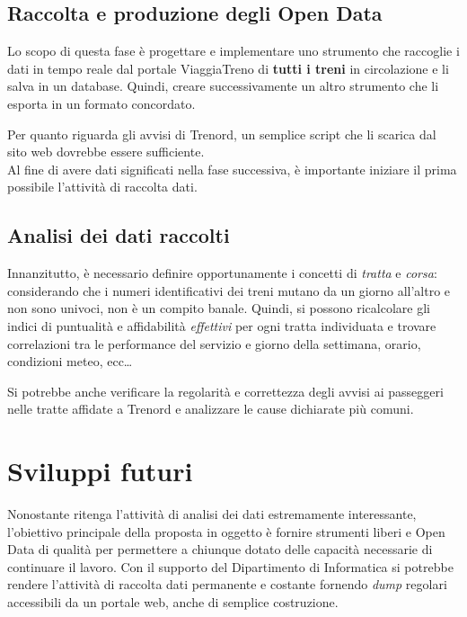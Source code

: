 \documentclass[italian,11pt,a4paper,final]{article}
\begin{document}
	\subsection{Raccolta e produzione degli Open Data}
	Lo scopo di questa fase è progettare e implementare uno strumento che raccoglie i dati in tempo reale dal portale ViaggiaTreno di \textbf{tutti i treni} in circolazione e li salva in un database.
	Quindi, creare successivamente un altro strumento che li esporta in un formato concordato.

	Per quanto riguarda gli avvisi di Trenord, un semplice script che li scarica dal sito web dovrebbe essere sufficiente. \\

	Al fine di avere dati significati nella fase successiva, è importante iniziare il prima possibile l'attività di raccolta dati.

	\subsection{Analisi dei dati raccolti}
	Innanzitutto, è necessario definire opportunamente i concetti di \textit{tratta} e \textit{corsa}: considerando che i numeri identificativi dei treni mutano da un giorno all'altro e non sono univoci, non è un compito banale.
	Quindi, si possono ricalcolare gli indici di puntualità e affidabilità \textit{effettivi} per ogni tratta individuata e trovare correlazioni tra le performance del servizio e giorno della settimana, orario, condizioni meteo, ecc\ldots

	Si potrebbe anche verificare la regolarità e correttezza degli avvisi ai passeggeri nelle tratte affidate a Trenord e analizzare le cause dichiarate più comuni. \\

	\section{Sviluppi futuri}

	Nonostante ritenga l'attività di analisi dei dati estremamente interessante, l'obiettivo principale della proposta in oggetto è fornire strumenti liberi e Open Data di qualità per permettere a chiunque dotato delle capacità necessarie di continuare il lavoro.
	Con il supporto del Dipartimento di Informatica si potrebbe rendere l'attività di raccolta dati permanente e costante fornendo \textit{dump} regolari accessibili da un portale web, anche di semplice costruzione.
\end{document}
